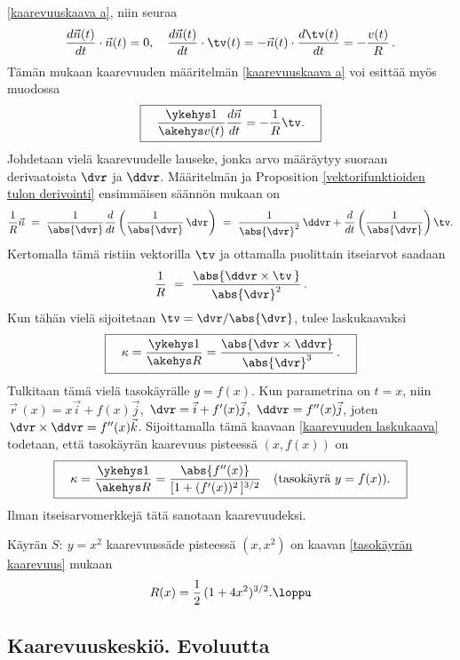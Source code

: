 \eqref{kaarevuuskaava a}, niin seuraa
\[
\frac{d\vec n(t)}{dt}\cdot\vec n(t)=0, \quad
\frac{d\vec n(t)}{dt}\cdot\tv(t) = -\vec n(t)\cdot\frac{d\tv(t)}{dt}=-\frac{v(t)}{R}\,.
\]
Tämän mukaan kaarevuuden määritelmän \eqref{kaarevuuskaava a} voi esittää myös muodossa
\begin{equation} \label{kaarevuuskaava b}
\boxed{\quad \frac{\ykehys 1}{\akehys v(t)}\frac{d\vec n}{dt}
              =-\frac{1}{R}\tv. \quad }
\end{equation}
Johdetaan vielä kaarevuudelle lauseke, jonka arvo määräytyy suoraan derivaatoista $\dvr$ ja 
$\ddvr$. Määritelmän ja Proposition \ref{vektorifunktioiden tulon derivointi} ensimmäisen
säännön mukaan on
\[
\frac{1}{R}\vec n\ =\ \frac{1}{\abs{\dvr}}\frac{d}{dt}\left(\frac{1}{\abs{\dvr}}\,\dvr\right)\
             =\ \frac{1}{\abs{\dvr}^2}\,\ddvr+\frac{d}{dt}\left(\frac{1}{\abs{\dvr}}\right)\tv.
\]
Kertomalla tämä ristiin vektorilla $\tv$ ja ottamalla puolittain itseiarvot saadaan
\[
\frac{1}{R}\ =\ \frac{\abs{\ddvr\times\tv\,}}{\abs{\dvr}^2}\,.
\]
Kun tähän vielä sijoitetaan $\tv=\dvr/\abs{\dvr}$, tulee laskukaavaksi
\begin{equation} \label{kaarevuuden laskukaava}
\boxed{\quad \kappa = \frac{\ykehys 1}{\akehys R}
                    =\frac{\abs{\dvr\times\ddvr}}{\abs{\dvr}^3}\,. \quad}
\end{equation}
Tulkitaan tämä vielä tasokäyrälle $y=f(x)$. Kun parametrina on $t=x$, niin
$\,\vec r\,(x) = x\vec i + f(x)\vec j$, $\,\dvr = \vec i + f'(x)\vec j$,
$\,\ddvr=f''(x)\vec j$, joten $\,\dvr\times\ddvr=f''(x)\vec k$. Sijoittamalla tämä kaavaan
\eqref{kaarevuuden laskukaava} todetaan, että tasokäyrän kaarevuus pisteessä $(x,f(x))$ on
\begin{equation} \label{tasokäyrän kaarevuus}
\boxed{\quad \kappa=\frac{\ykehys 1}{\akehys R}
     =\frac{\abs{f''(x)}}{[1+(f'(x))^2\,]^{3/2}} \quad (\text{tasokäyrä $y=f(x)$}). \quad}
\end{equation}
%
Ilman itseisarvomerkkejä tätä sanotaan  kaarevuudeksi.
\begin{Exa} Käyrän $S:\ y = x^2$ kaarevuussäde pisteessä $(x,x^2)$ on kaavan 
\eqref{tasokäyrän kaarevuus} mukaan
\[ R(x) = \frac{1}{2}\,(1+4x^2)^{3/2}. \loppu \]
\end{Exa}

\subsection*{Kaarevuuskeskiö. Evoluutta}
 

